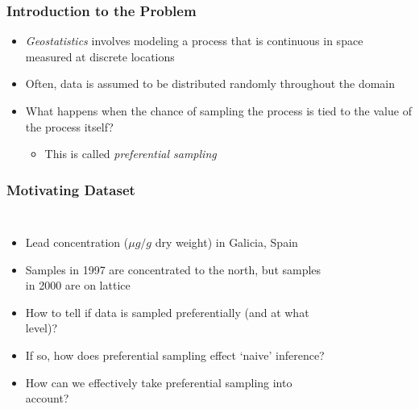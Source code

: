 \documentclass[xcolor=svgnames]{beamer}
\begin{document}
\begin{frame}
\frametitle{Introduction to the Problem}
\begin{itemize}
\item \emph{Geostatistics} involves modeling a process that is continuous in space measured at discrete locations
\item Often, data is assumed to be distributed randomly throughout the domain
\item What happens when the chance of sampling the process is tied to the value of the process itself?
\begin{itemize}
\item This is called \emph{preferential sampling}
\end{itemize}

\end{itemize}

\end{frame}
\begin{frame}
\frametitle{Motivating Dataset}
\begin{columns}[l]

\column{2.5in}
\begin{itemize}
\item Lead concentration ($\mu g/g$ dry weight) in Galicia, Spain
\item Samples in 1997 are concentrated to the north, but samples in 2000 are on lattice
\item How to tell if data is sampled preferentially (and at what level)?
\item If so, how does preferential sampling effect `naive' inference?
\item How can we effectively take preferential sampling into account?
\end{itemize}

\column{2.5in}
\begin{figure}
\centering
{}
\end{figure}

\end{columns}

\end{frame}
\end{document}
